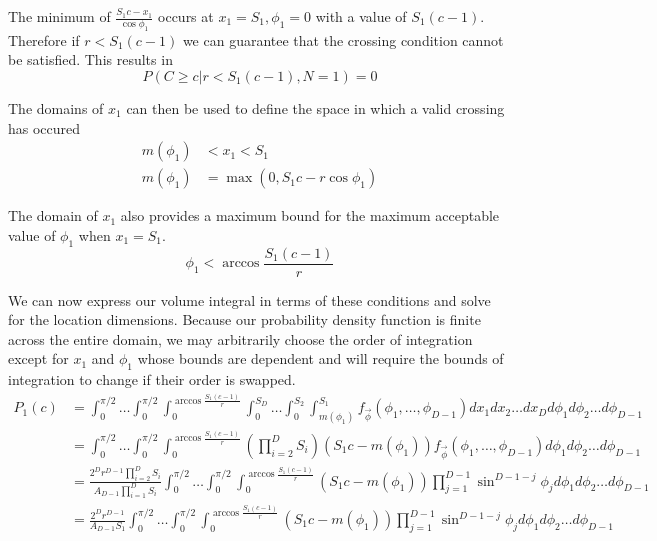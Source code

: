 \documentclass{article}
\begin{document}
The minimum of $\frac{S_1c - x_1}{\cos{\phi_1}}$ occurs at $x_1=S_1, \phi_1=0$ with a value of $S_1(c-1)$. Therefore if $r<S_1(c-1)$ we can guarantee that the crossing condition
cannot be satisfied. This results in
\begin{equation}
	P(C\ge c|r<S_1(c-1), N=1) = 0
\end{equation}

The domains of $x_1$ can then be used to define the space in which a valid crossing has occured 
\begin{align} 
	m(\phi_1) &< x_1 < S_1 \\ \label{eq:crossing condition 0}
	m(\phi_1) &= \max(0, S_1c-r\cos{\phi_1}) 
\end{align}

The domain of $x_1$ also provides a maximum bound for the maximum acceptable value of $\phi_1$ when $x_1 = S_1$.
\begin{equation}
	\phi_1 < \arccos{\frac{S_1(c-1)}{r}}
\end{equation}


We can now express our volume integral in terms of these conditions and solve for the location dimensions. Because our probability density function is finite across the entire domain, we may arbitrarily choose the order of integration except
for $x_1$ and $\phi_1$ whose bounds are dependent and will require the bounds of integration to change if their order is swapped.
\begin{align} \label{eq:volume integral}
	P_1(c) &= \int_0^{\pi/2} \hdots \int_0^{\pi/2} \int_0^{\arccos{\frac{S_1(c-1)}{r}}}\int_0^{S_D} \hdots \int_0^{S_2} \int_{m(\phi_1)}^{S_1} f_{\vec\phi}(\phi_1,\hdots,\phi_{D-1})dx_1 dx_2 \hdots dx_D d\phi_1 d\phi_2 \hdots d\phi_{D-1}\\
	&= \int_0^{\pi/2} \hdots \int_0^{\pi/2}\int_0^{\arccos{\frac{S_1(c-1)}{r}}}\left(\prod_{i=2}^DS_i\right)\left(S_1c-m(\phi_1)\right)  f_{\vec\phi}(\phi_1,\hdots,\phi_{D-1}) d\phi_1 d\phi_2 \hdots d\phi_{D-1} \\
	&= \frac{ 2^Dr^{D-1} \prod_{i=2}^DS_i}{A_{D-1}\prod_{i=1}^DS_i}\int_0^{\pi/2} \hdots \int_0^{\pi/2}\int_0^{\arccos{\frac{S_1(c-1)}{r}}} (S_1c-m(\phi_1)) \prod_{j=1}^{D-1}\sin^{D-1-j}\phi_j d\phi_1 d\phi_2\hdots d\phi_{D-1}\\
	&= \frac{ 2^Dr^{D-1}}{A_{D-1}S_1}\int_0^{\pi/2} \hdots \int_0^{\pi/2}\int_0^{\arccos{\frac{S_1(c-1)}{r}}} (S_1c-m(\phi_1)) \prod_{j=1}^{D-1}\sin^{D-1-j}\phi_j d\phi_1 d\phi_2 \hdots d\phi_{D-1}
\end{align}
\end{document}
